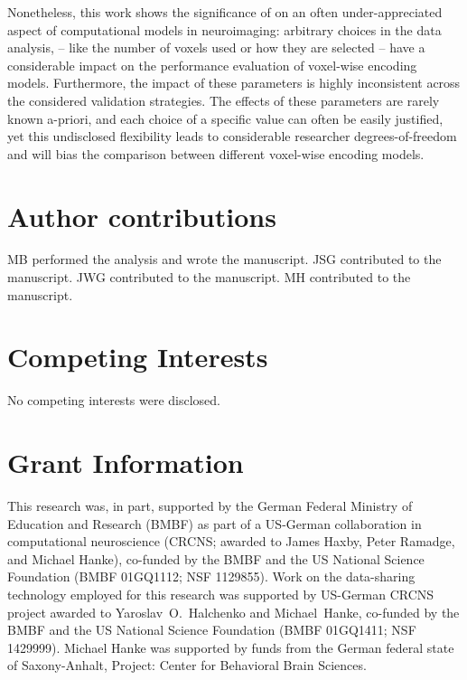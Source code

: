 Nonetheless, this work shows the significance of on an often under-appreciated aspect of
computational models in neuroimaging: arbitrary choices in the data analysis,
-- like the number of voxels used or how they are selected --
have a considerable impact on the performance evaluation of
voxel-wise encoding models. Furthermore, the impact of these parameters is
highly inconsistent across the considered validation strategies.
The effects of these parameters are rarely known a-priori, and each choice of a specific value can often
be easily justified, yet this undisclosed flexibility leads to considerable researcher degrees-of-freedom
\citep{SNS11,hong2019false} and will bias the comparison between different
voxel-wise encoding models.

\section*{Author contributions}

MB performed the analysis and wrote the manuscript.
JSG contributed to the manuscript.
JWG contributed to the manuscript.
MH contributed to the manuscript.

\section*{Competing Interests}

No competing interests were disclosed.

\section*{Grant Information}

This research was, in part, supported by the German Federal Ministry of
Education and Research (BMBF) as part of a US-German collaboration in
computational neuroscience (CRCNS; awarded to James Haxby, Peter Ramadge, and
Michael Hanke), co-funded by the BMBF and the US National Science Foundation
(BMBF 01GQ1112; NSF 1129855).  Work on the data-sharing technology employed for
this research was supported by US-German CRCNS project awarded to
Yaroslav~O.~Halchenko and Michael~Hanke, co-funded by the BMBF and the US
National Science Foundation (BMBF 01GQ1411; NSF 1429999).  Michael Hanke was
supported by funds from the German federal state of Saxony-Anhalt, Project:
Center for Behavioral Brain Sciences.


